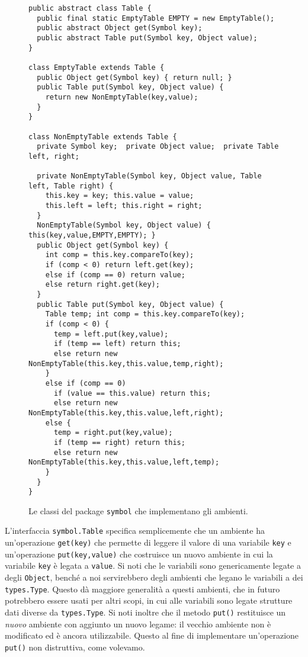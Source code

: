 \begin{figure}
{\small
\begin{verbatim}
public abstract class Table {
  public final static EmptyTable EMPTY = new EmptyTable();
  public abstract Object get(Symbol key);
  public abstract Table put(Symbol key, Object value);
}

class EmptyTable extends Table {
  public Object get(Symbol key) { return null; }
  public Table put(Symbol key, Object value) {
    return new NonEmptyTable(key,value);
  }
}

class NonEmptyTable extends Table {
  private Symbol key;  private Object value;  private Table left, right;

  private NonEmptyTable(Symbol key, Object value, Table left, Table right) {
    this.key = key; this.value = value;
    this.left = left; this.right = right;
  }
  NonEmptyTable(Symbol key, Object value) { this(key,value,EMPTY,EMPTY); }
  public Object get(Symbol key) {
    int comp = this.key.compareTo(key);
    if (comp < 0) return left.get(key);
    else if (comp == 0) return value;
    else return right.get(key);
  }
  public Table put(Symbol key, Object value) {
    Table temp; int comp = this.key.compareTo(key);
    if (comp < 0) {
      temp = left.put(key,value);
      if (temp == left) return this;
      else return new NonEmptyTable(this.key,this.value,temp,right);
    } 
    else if (comp == 0)
      if (value == this.value) return this;
      else return new NonEmptyTable(this.key,this.value,left,right);
    else {
      temp = right.put(key,value);
      if (temp == right) return this;
      else return new NonEmptyTable(this.key,this.value,left,temp);
    }
  }
}
\end{verbatim}
}
\caption{Le classi del package \texttt{symbol} che implementano gli ambienti.}
  \label{fig:symbol.Table}
\end{figure}
%
L'interfaccia \texttt{symbol.Table} specifica semplicemente che un ambiente
ha un'operazione \texttt{get(key)}
che permette di leggere il valore di una variabile \texttt{key} e un'operazione
\texttt{put(key,value)} che costruisce un nuovo ambiente in cui
la variabile \texttt{key} \`e legata a \texttt{value}.
Si noti che le variabili sono genericamente legate a degli
\texttt{Object}, bench\'e a noi servirebbero degli ambienti che legano
le variabili a dei \texttt{types.Type}. Questo d\`a maggiore generalit\`a
a questi ambienti, che in futuro potrebbero essere usati per altri scopi,
in cui alle variabili sono legate strutture dati diverse da
\texttt{types.Type}.
Si noti inoltre che il metodo \texttt{put()} restituisce un \emph{nuovo}
ambiente con aggiunto
un nuovo legame: il vecchio ambiente non \`e modificato
ed \`e ancora utilizzabile. Questo al fine di implementare un'operazione
\texttt{put()} non distruttiva, come volevamo.

